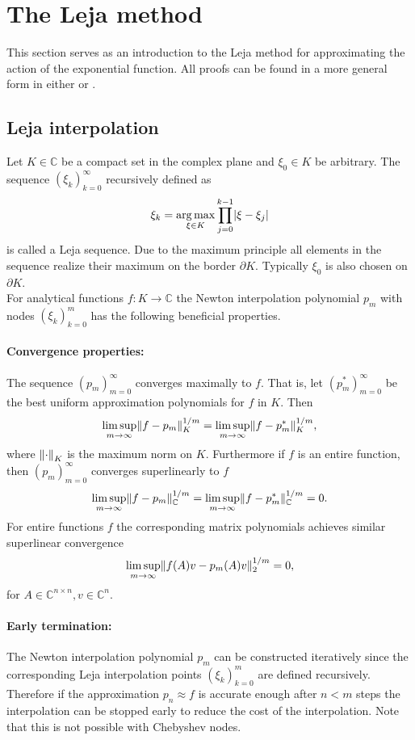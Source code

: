 \documentclass{scrartcl}
\begin{document}
\section{The Leja method}
This section serves as an introduction to the Leja method for approximating the action of the exponential function. All proofs can be found in a more general form in either \cite{advdif} or \cite{lejarev}. 

\subsection{Leja interpolation}
Let $K\in\mathbb{C}$ be a compact set in the complex plane and $\xi_0\in K$ be arbitrary. The sequence $(\xi_k)_{k=0}^{\infty}$ recursively defined as
\[\xi_k = \underset{{\xi\in K}}{\operatorname{arg\,max}}\displaystyle\prod_{j=0}^{k-1}\lvert\xi-\xi_j\rvert\]
is called a Leja sequence. Due to the maximum principle all elements in the sequence realize their maximum on the border $\partial K$. Typically $\xi_0$ is also chosen on $\partial K$.\\
For analytical functions $f\!:K\to\mathbb{C}$ the Newton interpolation polynomial $p_m$ with nodes $(\xi_k)_{k=0}^{m}$ has the following beneficial properties. 
\paragraph{Convergence properties:}
The sequence $(p_m)_{m=0}^\infty$ converges maximally to $f$. That is, let $(p_m^{*})_{m=0}^\infty$ be the best uniform approximation polynomials for $f$ in $K$. Then
\[\limsup\limits_{m \rightarrow \infty}\lVert f-p_m\rVert_{K}^{1/m} = \limsup\limits_{m \rightarrow \infty}\lVert f-p_m^{*}\rVert_{K}^{1/m},\]
where ${\lVert\cdot\rVert}_K$ is the maximum norm on $K$. Furthermore if $f$ is an entire function, then $(p_m)_{m=0}^\infty$ converges superlinearly to $f$
\[\limsup\limits_{m \rightarrow \infty}\lVert f-p_m\rVert_{\mathbb{C}}^{1/m} = \limsup\limits_{m \rightarrow \infty}\lVert f-p_m^{*}\rVert_{\mathbb{C}}^{1/m} = 0. \]
For entire functions $f$ the corresponding matrix polynomials achieves similar superlinear convergence
\[\limsup\limits_{m \rightarrow \infty}\lVert f(A)v-p_m(A)v\rVert_{2}^{1/m} = 0, \]
for $A\in\mathbb{C}^{n\times n}, v\in\mathbb{C}^n$.

\paragraph{Early termination:}
The Newton interpolation polynomial $p_m$ can be constructed iteratively since the corresponding Leja interpolation points $(\xi_k)_{k=0}^{m}$ are defined recursively. Therefore if the approximation $p_n \approx f$ is accurate enough after $n<m$ steps the interpolation can be stopped early to reduce the cost of the interpolation. Note that this is not possible with Chebyshev nodes.
\end{document}

